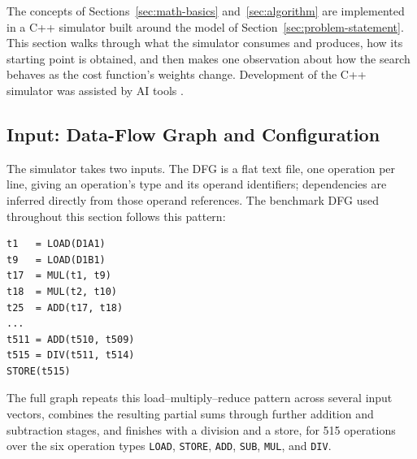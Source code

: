 \documentclass[conference]{IEEEtran}
\begin{document}
    The concepts of Sections~\ref{sec:math-basics} and~\ref{sec:algorithm} are implemented in a C++ simulator built around the model of
    Section~\ref{sec:problem-statement}. This section walks through what the simulator consumes and
    produces, how its starting point is obtained, and then makes one observation about how the search
    behaves as the cost function's weights change. Development of the C++ simulator was assisted by AI tools
    \cite{Anthropic_Claude_2026, OpenAI_ChatGPT_2026}.

    \subsection{Input: Data-Flow Graph and Configuration}
    \label{sec:sim-input}

    The simulator takes two inputs. The DFG is a flat text file, one operation per line, giving an
    operation's type and its operand identifiers; dependencies are inferred directly from those
    operand references. The benchmark DFG used throughout this section follows this pattern:
    \begin{verbatim}
t1   = LOAD(D1A1)
t9   = LOAD(D1B1)
t17  = MUL(t1, t9)
t18  = MUL(t2, t10)
t25  = ADD(t17, t18)
...
t511 = ADD(t510, t509)
t515 = DIV(t511, t514)
STORE(t515)
    \end{verbatim}
    The full graph repeats this load--multiply--reduce pattern across several input vectors, combines
    the resulting partial sums through further addition and subtraction stages, and finishes with a
    division and a store, for 515 operations over the six operation types \texttt{LOAD}, \texttt{STORE},
    \texttt{ADD}, \texttt{SUB}, \texttt{MUL}, and \texttt{DIV}.
\end{document}
